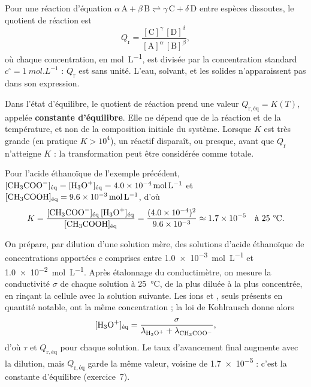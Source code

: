 \begin{definition}
Pour une réaction d'équation $\alpha\,\mathrm{A}+\beta\,\mathrm{B}\rightleftharpoons\gamma\,\mathrm{C}+\delta\,\mathrm{D}$
entre espèces dissoutes, le quotient de réaction est
\[Q_\mathrm{r}=\frac{[\mathrm{C}]^{\gamma}\,[\mathrm{D}]^{\delta}}{[\mathrm{A}]^{\alpha}\,[\mathrm{B}]^{\beta}},\]
où chaque concentration, en \unit{mol.L^{-1}}, est divisée par la concentration standard $c^\circ=\qty{1}{mol.L^{-1}}$ :
$Q_\mathrm{r}$ est sans unité. L'eau, solvant, et les solides n'apparaissent pas dans son expression.
\end{definition}
\begin{propriete}
Dans l'état d'équilibre, le quotient de réaction prend une valeur $Q_{\mathrm{r},\text{éq}}=K(T)$, appelée
\textbf{constante d'équilibre}. Elle ne dépend que de la réaction et de la température, et non de la composition
initiale du système. Lorsque $K$ est très grande (en pratique $K>10^4$), un réactif disparaît, ou presque, avant que
$Q_\mathrm{r}$ n'atteigne $K$ : la transformation peut être considérée comme totale.
\end{propriete}
\begin{exemple}
Pour l'acide éthanoïque de l'exemple précédent, $[\ce{CH3COO-}]_\text{éq}=[\ce{H3O+}]_\text{éq}=\qty{4,0e-4}{mol.L^{-1}}$
et $[\ce{CH3COOH}]_\text{éq}=\qty{9,6e-3}{mol.L^{-1}}$, d'où
\[K=\frac{[\ce{CH3COO-}]_\text{éq}\,[\ce{H3O+}]_\text{éq}}{[\ce{CH3COOH}]_\text{éq}}=\frac{(\num{4.0e-4})^2}{\num{9.6e-3}}\approx\num{1.7e-5}\quad\text{à 25~°C}.\]
\end{exemple}
\begin{experience}
On prépare, par dilution d'une solution mère, des solutions d'acide éthanoïque de concentrations apportées $c$
comprises entre \qty{1,0e-3}{mol.L^{-1}} et \qty{1,0e-2}{mol.L^{-1}}. Après étalonnage du conductimètre, on mesure la
conductivité $\sigma$ de chaque solution à 25~°C, de la plus diluée à la plus concentrée, en rinçant la cellule avec
la solution suivante. Les ions  et , seuls présents en quantité notable, ont la même
concentration ; la loi de Kohlrausch donne alors
\[[\ce{H3O+}]_\text{éq}=\frac{\sigma}{\lambda_{\ce{H3O+}}+\lambda_{\ce{CH3COO-}}},\]
d'où $\tau$ et $Q_{\mathrm{r},\text{éq}}$ pour chaque solution. Le taux d'avancement final augmente avec la dilution, mais
$Q_{\mathrm{r},\text{éq}}$ garde la même valeur, voisine de \num{1.7e-5} : c'est la constante d'équilibre (exercice~7).
\end{experience}
